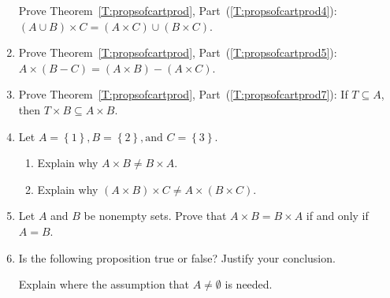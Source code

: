 \begin{enumerate}
\xitem Prove Theorem~\ref{T:propsofcartprod}, Part~(\ref{T:propsofcartprod4}): $\left( {A \cup B} \right) \times C = \left( {A \times C} \right) \cup \left( {B \times C} \right)$. \label{exer:sec44-4}

\item Prove Theorem~\ref{T:propsofcartprod}, Part~(\ref{T:propsofcartprod5}): $A \times \left( {B - C} \right) = \left( {A \times B} \right) - \left( {A \times C} \right)$.

\item Prove Theorem~\ref{T:propsofcartprod}, Part~(\ref{T:propsofcartprod7}): If  $T \subseteq A$, then  $T \times B \subseteq A \times B$. \label{exer:sec44-6}

\item Let  $A = \left\{ 1 \right\}\!, B = \left\{ 2 \right\}\!, \text{and }C = \left\{ 3 \right\}$.
\label{exer:sec44-7}

\begin{enumerate}
  \item Explain why  $A \times B \ne B \times A$.
  \item Explain why  $\left( {A \times B} \right) \times C \ne A \times \left( {B \times C} \right)$.
\end{enumerate}

\item Let  $A$  and  $B$  be nonempty sets.  Prove that  $A \times B = B \times A$
if and only if  $A = B$.

\item Is the following proposition true or false? Justify your conclusion. \label{exer:sec44-9}


Explain where the assumption that $A \ne \emptyset $ is needed.
\end{enumerate}

